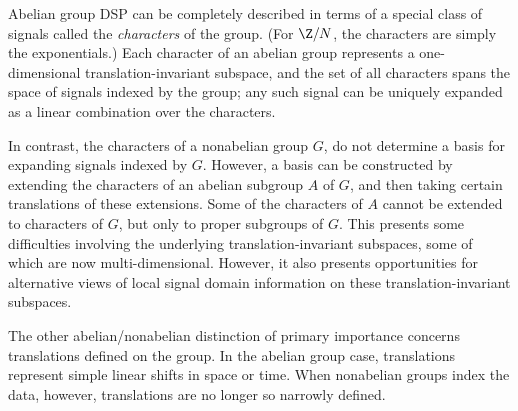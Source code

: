 Abelian group DSP can be completely described in terms of a
special class of signals called the \emph{characters} of the
group. (For $\Z/N$, the characters are simply the exponentials.)
Each character of an abelian group represents a one-dimensional
translation-invariant subspace, and the set of all characters
spans the space of signals indexed by the group; any such
signal can be uniquely expanded as a linear combination over
the characters.

In contrast, the characters of a nonabelian group $G$, %
do not determine a basis for expanding signals indexed by
$G$.  However, a basis can be constructed by extending the
characters of an abelian subgroup $A$ of $G$, and then taking
certain translations of these extensions.  Some of the
characters of $A$ cannot be extended to characters of $G$,
but only to proper subgroups of $G$.  This presents some
difficulties involving the underlying translation-invariant
subspaces, some of which are now multi-dimensional.
However, it also presents opportunities for alternative
views of local signal domain information on these
translation-invariant subspaces. 

The other abelian/nonabelian distinction of primary importance 
concerns translations defined on the group.  In the abelian group
case, translations represent simple linear shifts in space or time.
When nonabelian groups index the data, however, translations are no
longer so narrowly defined. 
